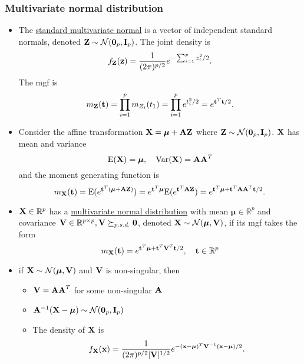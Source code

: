 \begin{itemize}
\subsubsection*{Multivariate normal distribution}
\begin{itemize}
	\item The \underline{standard multivariate normal} is a vector of independent standard normals, denoted $\mathbf{Z} \sim \mathcal{N}(\mathbf{0}_p, \mathbf{I}_p)$.  The joint density is
	$$
	f_{\mathbf{Z}}(\mathbf{z}) = \frac{1}{(2 \pi)^{p / 2}} e^{- \sum_{i = 1}^{p} z_i^2/2}.
	$$
	The mgf is 
	$$
	m_{\mathbf{Z}}(\mathbf{t}) = \prod\limits_{i = 1}^p m_{Z_i}(t_1) = \prod\limits_{i = 1}^p e^{t_i^2/2} = e^{\mathbf{t}^T\mathbf{t}/ 2}.
	$$
	\item Consider the affine transformation $\mathbf{X} = \boldsymbol{\mu} + \mathbf{AZ}$ where $\mathbf{Z} \sim \mathcal{N}(\mathbf{0}_p, \mathbf{I}_p)$.  $\mathbf{X}$ has mean and variance
	$$
	\mbox{E}(\mathbf{X}) = \boldsymbol{\mu}, \quad \mbox{Var}(\mathbf{X}) = \mathbf{AA}^T
	$$
	and the moment generating function is
	$$
	m_{\mathbf{X}}(\mathbf{t}) = \mbox{E}(e^{\mathbf{t}^T(\boldsymbol{\mu}  + \mathbf{AZ})}) = e^{\mathbf{t}^T\boldsymbol{\mu}}\mbox{E}(e^{\mathbf{t}^T\mathbf{AZ}}) = e^{\mathbf{t}^T\boldsymbol{\mu} + \mathbf{t}^T\mathbf{AA}^T\mathbf{t}/2}.
	$$
	\item $\mathbf{X}\in \mathbb{R}^p$ has a \underline{multivariate normal distribution} with mean $\boldsymbol{\mu} \in \mathbb{R}^p$ and covariance $\mathbf{V} \in \mathbb{R}^{p \times p}, \mathbf{V} \succeq_{p.s.d.} \mathbf{0}$, denoted $\mathbf{X} \sim \mathcal{N}(\boldsymbol{\mu}, \mathbf{V})$, if its mgf takes the form
	$$
	m_{\mathbf{X}}(\mathbf{t}) = e^{\mathbf{t}^T\boldsymbol{\mu} + \mathbf{t}^T\mathbf{V}^T\mathbf{t}/2}, \quad \mathbf{t} \in \mathbb{R}^p
	$$
	\item if $\mathbf{X} \sim \mathcal{N}(\boldsymbol{\mu}, \mathbf{V})$ and $\mathbf{V}$ is non-singular, then
	    \begin{itemize}
	    	\item $\mathbf{V=AA}^T$ for some non-singular $\mathbf{A}$
	    	\item $\mathbf{A}^{-1} (\mathbf{X} - \boldsymbol{\mu}) \sim \mathcal{N}(\mathbf{0}_p, \mathbf{I}_p)$
	    	\item The density of $\mathbf{X}$ is
	    	$$
	    	f_{\mathbf{X}}(\mathbf{x}) = \frac{1}{(2\pi)^{p / 2} |\mathbf{V}|^{1/ 2}}e^{-(\mathbf{x} - \boldsymbol{\mu})^T\mathbf{V}^{-1}(\mathbf{x} - \boldsymbol{\mu})/2}.
	    	$$
	    \end{itemize}

\end{itemize}
\end{itemize}
